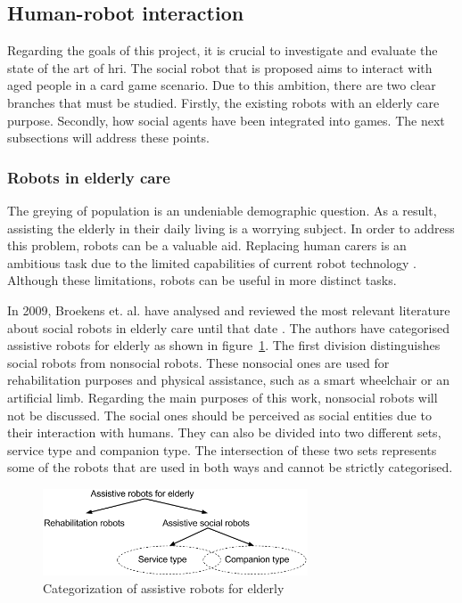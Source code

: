 \subsection{Human-robot interaction}

Regarding the goals of this project, it is crucial to investigate and evaluate the state of the art of \gls{hri}.
The social robot that is proposed aims to interact with aged people in a card game scenario.
Due to this ambition, there are two clear branches that must be studied.
Firstly, the existing robots with an elderly care purpose.
Secondly, how social agents have been integrated into games.
The next subsections will address these points.



\subsubsection{Robots in elderly care}


The greying of population is an undeniable demographic question.
As a result, assisting the elderly in their daily living is a worrying subject.
In order to address this problem, robots can be a valuable aid.
Replacing human carers is an ambitious task due to the limited capabilities of current robot technology \cite{Walters2013}.
Although these limitations, robots can be useful in more distinct tasks.

In 2009, Broekens et. al. have analysed and reviewed the most relevant literature about social robots in elderly care until that date \cite{Broekens2009}.
The authors have categorised assistive robots for elderly as shown in figure~\ref{fig:categorization}.
The first division distinguishes social robots from nonsocial robots.
These nonsocial ones are used for rehabilitation purposes and physical assistance, such as a smart wheelchair or an artificial limb.
Regarding the main purposes of this work, nonsocial robots will not be discussed.
The social ones should be perceived as social entities due to their interaction with humans.
They can also be divided into two different sets, service type and companion type.
The intersection of these two sets represents some of the robots that are used in both ways and cannot be strictly categorised.

\begin{figure}[h!]
  \centering
    \includegraphics[width=0.7\textwidth]{./img/categorization_robots}
  \caption{Categorization of assistive robots for elderly}
\label{fig:categorization}
\end{figure}

